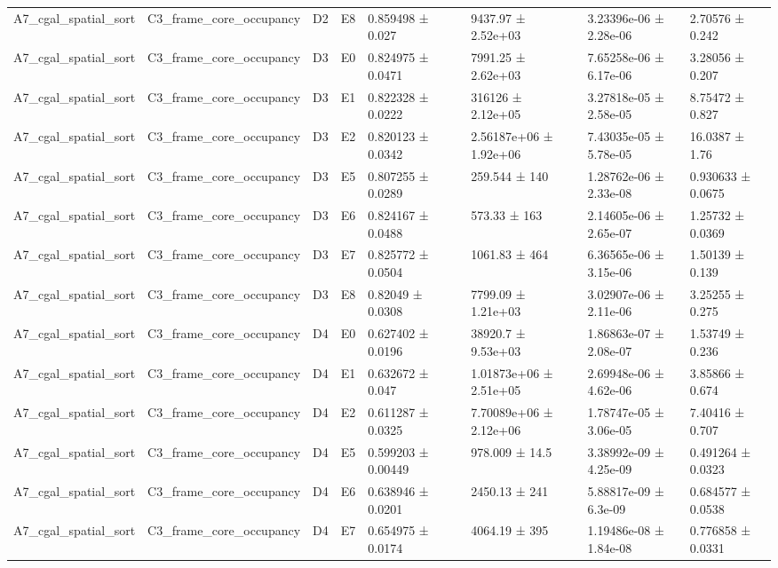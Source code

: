 \begin{table}
\begin{tabular}{lllllllll}
A7\_cgal\_spatial\_sort & C3\_frame\_core\_occupancy & D2 & E8 & 0.859498 ± 0.027 &  & 9437.97 ± 2.52e+03 & 3.23396e-06 ± 2.28e-06 & 2.70576 ± 0.242 \\
A7\_cgal\_spatial\_sort & C3\_frame\_core\_occupancy & D3 & E0 & 0.824975 ± 0.0471 &  & 7991.25 ± 2.62e+03 & 7.65258e-06 ± 6.17e-06 & 3.28056 ± 0.207 \\
A7\_cgal\_spatial\_sort & C3\_frame\_core\_occupancy & D3 & E1 & 0.822328 ± 0.0222 &  & 316126 ± 2.12e+05 & 3.27818e-05 ± 2.58e-05 & 8.75472 ± 0.827 \\
A7\_cgal\_spatial\_sort & C3\_frame\_core\_occupancy & D3 & E2 & 0.820123 ± 0.0342 &  & 2.56187e+06 ± 1.92e+06 & 7.43035e-05 ± 5.78e-05 & 16.0387 ± 1.76 \\
A7\_cgal\_spatial\_sort & C3\_frame\_core\_occupancy & D3 & E5 & 0.807255 ± 0.0289 &  & 259.544 ± 140 & 1.28762e-06 ± 2.33e-08 & 0.930633 ± 0.0675 \\
A7\_cgal\_spatial\_sort & C3\_frame\_core\_occupancy & D3 & E6 & 0.824167 ± 0.0488 &  & 573.33 ± 163 & 2.14605e-06 ± 2.65e-07 & 1.25732 ± 0.0369 \\
A7\_cgal\_spatial\_sort & C3\_frame\_core\_occupancy & D3 & E7 & 0.825772 ± 0.0504 &  & 1061.83 ± 464 & 6.36565e-06 ± 3.15e-06 & 1.50139 ± 0.139 \\
A7\_cgal\_spatial\_sort & C3\_frame\_core\_occupancy & D3 & E8 & 0.82049 ± 0.0308 &  & 7799.09 ± 1.21e+03 & 3.02907e-06 ± 2.11e-06 & 3.25255 ± 0.275 \\
A7\_cgal\_spatial\_sort & C3\_frame\_core\_occupancy & D4 & E0 & 0.627402 ± 0.0196 &  & 38920.7 ± 9.53e+03 & 1.86863e-07 ± 2.08e-07 & 1.53749 ± 0.236 \\
A7\_cgal\_spatial\_sort & C3\_frame\_core\_occupancy & D4 & E1 & 0.632672 ± 0.047 &  & 1.01873e+06 ± 2.51e+05 & 2.69948e-06 ± 4.62e-06 & 3.85866 ± 0.674 \\
A7\_cgal\_spatial\_sort & C3\_frame\_core\_occupancy & D4 & E2 & 0.611287 ± 0.0325 &  & 7.70089e+06 ± 2.12e+06 & 1.78747e-05 ± 3.06e-05 & 7.40416 ± 0.707 \\
A7\_cgal\_spatial\_sort & C3\_frame\_core\_occupancy & D4 & E5 & 0.599203 ± 0.00449 &  & 978.009 ± 14.5 & 3.38992e-09 ± 4.25e-09 & 0.491264 ± 0.0323 \\
A7\_cgal\_spatial\_sort & C3\_frame\_core\_occupancy & D4 & E6 & 0.638946 ± 0.0201 &  & 2450.13 ± 241 & 5.88817e-09 ± 6.3e-09 & 0.684577 ± 0.0538 \\
A7\_cgal\_spatial\_sort & C3\_frame\_core\_occupancy & D4 & E7 & 0.654975 ± 0.0174 &  & 4064.19 ± 395 & 1.19486e-08 ± 1.84e-08 & 0.776858 ± 0.0331 \\

\end{tabular}
\end{table}
